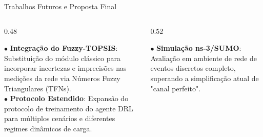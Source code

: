 \documentclass{beamer}
\begin{document}
\begin{frame}{Trabalhos Futuros e Proposta Final}
    \begin{columns}[T]
        \begin{column}{0.48\textwidth}
            \vspace*{0.1cm}
            \begin{tcolorbox}[colback=purple!5, colframe=purple!80!black, title=Evolução do Algoritmo, fonttitle=\bfseries\footnotesize, arc=0pt, outer arc=0pt, leftrule=3pt, rightrule=0.3pt, toprule=0.1pt, bottomrule=0.3pt]
                \scriptsize
                $\bullet$ \textbf{Integração do Fuzzy-TOPSIS}: Substituição do módulo clássico para incorporar incertezas e imprecisões nas medições da rede via Números Fuzzy Triangulares (TFNs).\\
                $\bullet$ \textbf{Protocolo Estendido}: Expansão do protocolo de treinamento do agente DRL para múltiplos cenários e diferentes regimes dinâmicos de carga.
            \end{tcolorbox}
        \end{column}
        
        \begin{column}{0.52\textwidth}
            \vspace*{0.1cm}
            \begin{tcolorbox}[colback=blue!5, colframe=blue!80!black, title=Validação e Simulação Realista, fonttitle=\bfseries\footnotesize, arc=0pt, outer arc=0pt, leftrule=3pt, rightrule=0.3pt, toprule=0.1pt, bottomrule=0.3pt]
                \scriptsize
                $\bullet$ \textbf{Simulação ns-3/SUMO}: Avaliação em ambiente de rede de eventos discretos completo, superando a simplificação atual de "canal perfeito".
            \end{tcolorbox}
        \end{column}
    \end{columns}
\end{frame}
\end{document}
